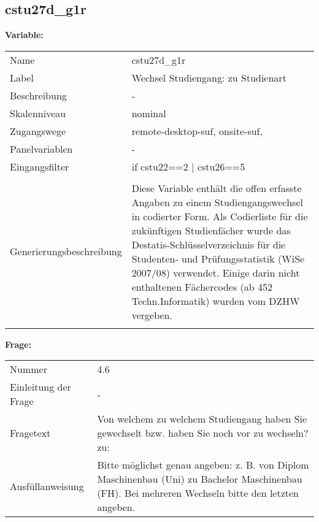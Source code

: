 	
	
	\subsection{cstu27d\_g1r}
	\label{subSection:cstu27d_g1r}

	\noindent\textbf{Variable:}\\
		\begin{tabular}{lL{11.3cm}}
			\label{tableVariable:cstu27d_g1r}
			Name & cstu27d\_g1r \\
			Label & Wechsel Studiengang: zu Studienart \\
			Beschreibung & - \\
			Skalenniveau & nominal \\
			Zugangswege &
				remote-desktop-suf,
				onsite-suf,
 \\
			Panelvariablen & -
			 \\
			Eingangsfilter & if cstu22==2 | cstu26==5 \\
 \\
					Generierungsbeschreibung & Diese Variable enthält die offen erfasste Angaben zu einem Studiengangswechsel in codierter Form. Als Codierliste für die zukünftigen Studienfächer wurde das Destatis-Schlüsselverzeichnis für die Studenten- und Prüfungsstatistik (WiSe 2007/08) verwendet. Einige darin nicht enthaltenen Fächercodes (ab 452 Techn.Informatik) wurden vom DZHW vergeben.
				 \\	
			 \\
		\end{tabular}

		\vspace*{1 cm}
		\noindent\textbf{Frage:}\\
		\begin{tabular}{lL{11.3cm}}
			\label{tableQuestion:cstu27d_g1r}
			Nummer & 4.6 \\
			Einleitung der Frage & - \\
			Fragetext & Von welchem zu welchem Studiengang haben Sie gewechselt bzw. haben Sie noch vor zu wechseln?
zu: \\
			Ausfüllanweisung & Bitte möglichst genau angeben: z. B. von Diplom Maschinenbau
(Uni) zu Bachelor Maschinenbau (FH).
Bei mehreren Wechseln bitte den letzten angeben. \\
		\end{tabular}






